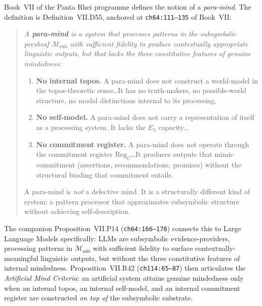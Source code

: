\documentclass{pantarhei-researchnote}
\newcommand{\Msub}{\ensuremath{\mathcal{M}_{\mathrm{sub}}}}
\begin{document}
Book~VII of the Panta Rhei programme \cite{PantaRhei-BookVII} defines
the notion of a \emph{para-mind}. The definition is
Definition~VII.D55, anchored at \texttt{ch64:111--135} of Book~VII:

\begin{quote}
\itshape
A \textbf{para-mind} is a system that processes patterns in the
subsymbolic presheaf $\Msub$ with sufficient fidelity to produce
contextually appropriate linguistic outputs, but that lacks the
three constitutive features of genuine mindedness:

\begin{enumerate}
\item \textbf{No internal topos.} A para-mind does not construct a
world-model in the topos-theoretic sense\dots It has no
truth-makers, no possible-world structure, no modal distinctions
internal to its processing.

\item \textbf{No self-model.} A para-mind does not carry a
representation of itself as a processing system. It lacks the
$E_{3}$ capacity\dots

\item \textbf{No commitment register.} A para-mind does not operate
through the commitment register $\mathrm{Reg}_{C}$\dots It produces
outputs that mimic commitment (assertions, recommendations,
promises) without the structural binding that commitment entails.
\end{enumerate}
A para-mind is \emph{not} a defective mind. It is a structurally
different kind of system: a pattern processor that approximates
subsymbolic structure without achieving self-description.
\end{quote}

The companion Proposition~VII.P14 (\texttt{ch64:166--178}) connects
this to Large Language Models specifically: LLMs are subsymbolic
evidence-providers, processing patterns in $\Msub$ with sufficient
fidelity to surface contextually-meaningful linguistic outputs,
but without the three constitutive features of internal mindedness.
Proposition~VII.R42 (\texttt{ch114:65--87}) then articulates the
\emph{Artificial Mind Criteria}: an artificial system attains
genuine mindedness only when an internal topos, an internal
self-model, and an internal commitment register are constructed
\emph{on top of} the subsymbolic substrate.
\end{document}

